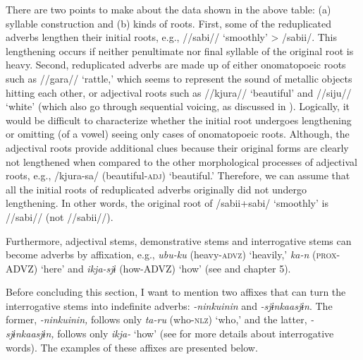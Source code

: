 There are two points to make about the data shown in the above table: (a) syllable construction and (b) kinds of roots. First, some of the reduplicated adverbs lengthen their initial roots, e.g., //sabi// ‘smoothly’ > /sabii/. This lengthening occurs if neither penultimate nor final syllable of the original root is heavy. Second, reduplicated adverbs are made up of either onomatopoeic roots such as //gara// ‘rattle,’ which seems to represent the sound of metallic objects hitting each other, or adjectival roots such as //kjura// ‘beautiful’ and //siju// ‘white’ (which also go through sequential voicing, as discussed in ). Logically, it would be difficult to characterize whether the initial root undergoes lengthening or omitting (of a vowel) seeing only cases of onomatopoeic roots. Although, the adjectival roots provide additional clues because their original forms are clearly not lengthened when compared to the other morphological processes of adjectival roots, e.g., /kjura-sa/ (beautiful-\textsc{adj}) ‘beautiful.’ Therefore, we can assume that all the initial roots of reduplicated adverbs originally did not undergo lengthening. In other words, the original root of /sabii+sabi/ ‘smoothly’ is //sabi// (not //sabii//).

Furthermore, adjectival stems, demonstrative stems and interrogative stems can become adverbs by affixation, e.g., \textit{ubu-ku} (heavy-\textsc{advz}) ‘heavily,’ \textit{ka-n} (\textsc{prox}-ADVZ) ‘here’ and \textit{ikja-sjɨ} (how-ADVZ) ‘how’ (see  and chapter 5).

Before concluding this section, I want to mention two affixes that can turn the interrogative stems into indefinite adverbs: \textit{{}-ninkuinin} and \textit{{}-sjɨnkaasjɨn}. The former, \textit{{}-ninkuinin,} follows only \textit{ta-ru} (who-\textsc{nlz}) ‘who,’ and the latter, \textit{{}-sjɨnkaasjɨn,} follows only \textit{ikja-} ‘how’ (see  for more details about interrogative words). The examples of these affixes are presented below.

